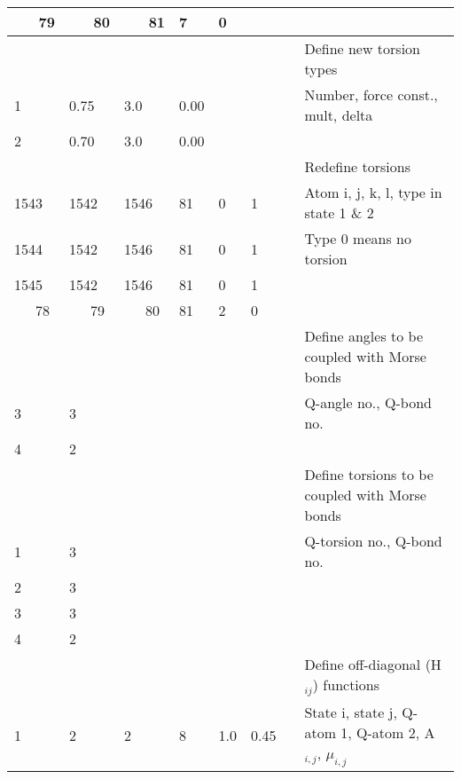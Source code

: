 \documentclass[a4paper,11pt]{article}
\begin{document}
\begin{longtable}{|p{35pt} p{35pt} p{35pt} p{35pt} p{35pt} p{35pt} p{35pt}| p{100pt}|}
  \hline~~~79 &~~~80 &~~~81 & 7 & 0        &  &  & \\
  \hline [torsion{\_}types] &     &  &  &  &  &  & Define new torsion types \\
  \hline 1 & 0.75 & 3.0 & 0.00          &  &  &  & Number, force const., mult, delta \\
  \hline 2 & 0.70 & 3.0 & 0.00          &  &  &  & \\
  \hline [change{\_}torsions] &   &  &  &  &  &  & Redefine torsions \\
  \hline 1543 & 1542 & 1546 & 81 & 0 & 1      &  & Atom i, j, k, l, type in state 1 \& 2 \\
  \hline 1544 & 1542 & 1546 & 81 & 0 & 1      &  & Type 0 means no torsion \\
  \hline 1545 & 1542 & 1546 & 81 & 0 & 1      &  & \\
  \hline ~~~78   & ~~~79 & ~~~80 & 81 & 2 & 0      &  & \\
  \hline [angle{\_}couplings] &   &  &  &  &  &  & Define angles to be coupled with Morse bonds \\
  \hline 3 & 3                    &  &  &  &  &  & Q-angle no., Q-bond no. \\
  \hline 4 & 2                    &  &  &  &  &  & \\
  \hline [torsion{\_}couplings]&  &  &  &  &  &  & Define torsions to be coupled with Morse bonds \\
  \hline 1 & 3                    &  &  &  &  &  & Q-torsion no., Q-bond no. \\
  \hline 2 & 3                    &  &  &  &  &  & \\
  \hline 3 & 3                    &  &  &  &  &  & \\
  \hline 4 & 2                    &  &  &  &  &  & \\
  \hline [off{\_}diagonals]    &  &  &  &  &  &  & Define off-diagonal (H$_{ij}$) functions \\
  \hline 1 & 2 & 2 & 8 & 1.0 & 0.45           &  & State i, state j, Q-atom 1, Q-atom 2, A$_{i,j}$, $\mu_{i,j}$ \\ \hline
\end{longtable}
\normalsize
\end{document}
